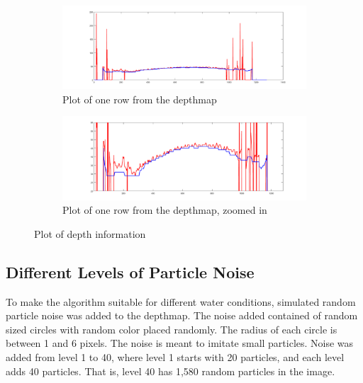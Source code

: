 \begin{figure}[H]
    \centering
    \begin{subfigure}{1\textwidth}
        \centering
        \includegraphics[width=1\linewidth]{images/results/plot_row}
        \caption{Plot of one row from the depthmap} 
        \label{fig:plot1}
    \end{subfigure}\hspace*{\fill}
    
    \medskip
    \begin{subfigure}{1\textwidth}
        \centering
        \includegraphics[width=1\linewidth]{images/results/plot_zoomed}
        \caption{Plot of one row from the depthmap, zoomed in} 
        \label{fig:plot2}
    \end{subfigure}\hspace*{\fill}
    \caption{Plot of depth information}
    \label{fig:row_plot}
\end{figure}




\subsection{Different Levels of Particle Noise} \label{section:noise}

To make the algorithm suitable for different water conditions, simulated random particle noise was added to the depthmap. The noise added contained of random sized circles with random color placed randomly. The radius of each circle is between 1 and 6 pixels. The noise is meant to imitate small particles.
Noise was added from level 1 to 40, where level 1 starts with 20 particles, and each level adds 40 particles. That is, level 40 has 1,580 random particles in the image.

